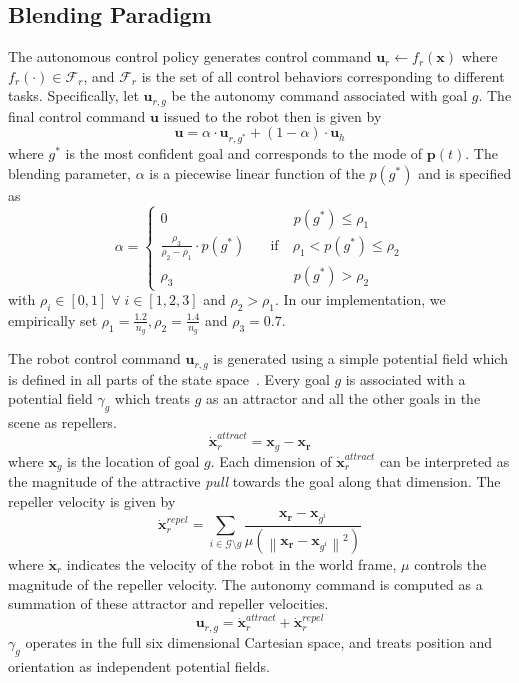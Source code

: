 \documentclass[conference]{IEEEtran}
\newcommand{\norm}[1]{\left\lVert#1\right\rVert}
\begin{document}
\subsection{Blending Paradigm}\label{ssec:blending}
The autonomous control policy generates control command
$\boldsymbol{u}_r \leftarrow f_{r}(\boldsymbol{x})$
where $f_{r}(\cdot) \in \mathcal{F}_{r}$, and $\mathcal{F}_{r}$ is the set of all control behaviors corresponding to different tasks. 
Specifically, let $\boldsymbol{u}_{r,g}$ be the autonomy command associated with goal $g$. The final control command $\boldsymbol{u}$ issued to the robot then is given by
\begin{equation*}
\boldsymbol{u} = \alpha\cdot \boldsymbol{u}_{r,g^*} + (1 - \alpha)\cdot \boldsymbol{u}_h
\end{equation*}
where $g^*$ is the most confident goal and corresponds to the mode of $\boldsymbol{p}(t)$. The blending parameter, $\alpha$ is a piecewise linear function of the $p(g^*)$ and is specified as
$$
\alpha = \left\{
\begin{array}{ll}
0 & \quad\quad~~~ p(g^*) \leq \rho_1 \\
\frac{\rho_3}{\rho_2 - \rho_1}\cdot p(g^*) &  \quad \text{if}\quad \rho_1 < p(g^*) \leq \rho_2  \\
\rho_3 & \quad\quad~~~ p(g^*) > \rho_2 	
\end{array}
\right.
$$
with $\rho_i \in [0, 1] \;\forall\; i \in [1,2,3]$ and $ \rho_2 > \rho_1$. 
In our implementation, we empirically set $\rho_1 = \frac{1.2}{n_g}, \rho_2 = \frac{1.4}{n_g}$ and $ \rho_3 = 0.7$.

The robot control command $\boldsymbol{u}_{r,g}$ is generated using a simple potential field which is defined in all parts of the state space~\citep{khatib1986real}. Every goal $g$ is associated with a potential field $\gamma_g$ which treats $g$ as an attractor and all the other goals in the scene as repellers.
\begin{equation*}
\dot{\boldsymbol{x}}_r^{attract} = \boldsymbol{x}_{g} - \boldsymbol{x_r}
\end{equation*}
where $\boldsymbol{x}_{g}$ is the location of goal $g$. Each dimension of $\dot{\boldsymbol{x}}_r^{attract}$ can be interpreted as the magnitude of the attractive \textit{pull} towards the goal along that dimension. 
The repeller velocity is given by
\begin{equation*}
\dot{\boldsymbol{x}}_r^{repel} = \sum_{i \in \mathcal{G} \setminus g} \frac{\boldsymbol{x_r} - \boldsymbol{x}_{g^i}}{\mu(\norm{\boldsymbol{x_r} - \boldsymbol{x}_{g^i}}^2)}
\end{equation*}
where $\dot{\boldsymbol{x}}_r$ indicates the velocity of the robot in the world frame, $\mu$ controls the magnitude of the repeller velocity. The autonomy command is computed as a summation of these attractor and repeller velocities.
\begin{equation*}
\boldsymbol{u}_{r,g} = \dot{\boldsymbol{x}}_r^{attract} + \dot{\boldsymbol{x}}_r^{repel} 
\end{equation*}
$\gamma_g$ operates in the full six dimensional Cartesian space, and treats position and orientation as independent potential fields. 
\end{document}
